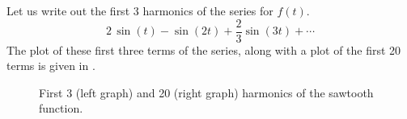 \begin{example}
Let us write out the first 3 harmonics of the series for $f(t)$.
\begin{equation*}
2 \, \sin (t)
- \sin (2t)
+\frac{2}{3} \sin (3t)
+ \cdots
\end{equation*}
The plot of these first three terms of the series, along with a plot
of the first 20 terms is given in
.

\begin{figure}[h!t]
\capstart
\begin{center}
\qquad
{}
\caption{First 3 (left graph) and 20 (right graph) harmonics of the sawtooth
function.\label{ts:sawtoothfsfig}}
\end{center}
\end{figure}
\end{example}

